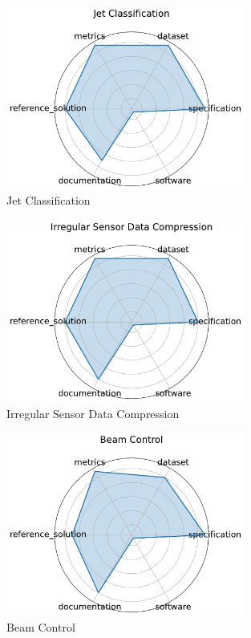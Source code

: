 \documentclass{article}
\begin{document}
\begin{figure}[h!]
  \centering
  \includegraphics[width=0.7\textwidth]{Jet Classification_radar.pdf}
  \caption{Jet Classification \cite{duarte2022fastmlsciencebenchmarksaccelerating}}
\end{figure}

\begin{figure}[h!]
  \centering
  \includegraphics[width=0.7\textwidth]{Irregular Sensor Data Compression_radar.pdf}
  \caption{Irregular Sensor Data Compression \cite{duarte2022fastmlsciencebenchmarksaccelerating2}}
\end{figure}

\begin{figure}[h!]
  \centering
  \includegraphics[width=0.7\textwidth]{Beam Control_radar.pdf}
  \caption{Beam Control \cite{kafkes2021boostrdatasetacceleratorcontrol, duarte2022fastmlsciencebenchmarksaccelerating3}}
\end{figure}
\end{document}

